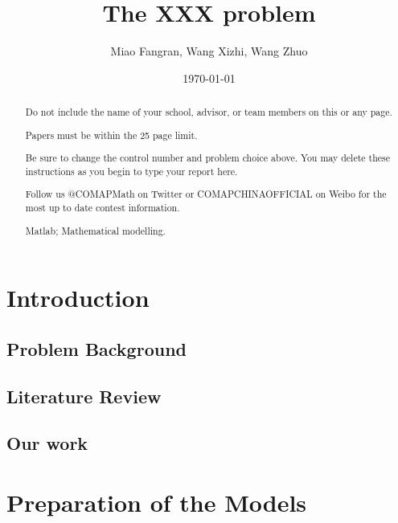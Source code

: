 \documentclass{mcmthesis}
\title{The XXX problem}
\author{Miao Fangran, Wang Xizhi, Wang Zhuo}
\date{\today}
\begin{document}
\begin{abstract}
Do not include the name of your school, advisor, or team members on this or any page.

Papers must be within the 25 page limit.

Be sure to change the control number and problem choice above.
You may delete these instructions as you begin to type your report here.

Follow us @COMAPMath on Twitter or COMAPCHINAOFFICIAL on Weibo for the most up to date contest information.

\begin{keywords}
Matlab; Mathematical modelling.
\end{keywords}
\end{abstract}
\maketitle
\tableofcontents
\newpage
\section{Introduction}
\subsection{Problem Background}

\subsection{Literature Review}

\subsection{Our work}



\section{Preparation of the Models}
\end{document}
